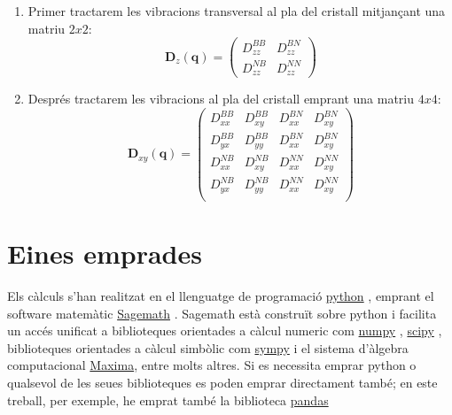 \documentclass[12pt]{article} %
\let\vec\mathbf %
\begin{document}
\begin{enumerate}
 \item Primer tractarem les vibracions transversal al pla del cristall mitjançant una matriu $2x2$:
 \begin{equation}
  \vec D_z(\vec q)=
  \begin{pmatrix}
    D_{zz}^{BB}  & D_{zz}^{BN}        \\
    D_{zz}^{NB}  & D_{zz}^{NN} 
  \end{pmatrix}
\end{equation}

 \item Després tractarem les vibracions al pla del cristall emprant una matriu $4x4$:
 \begin{equation}
  \vec D_{xy}(\vec q)=
  \begin{pmatrix}
   D_{xx}^{BB} & D_{xy}^{BB} & D_{xx}^{BN} & D_{xy}^{BN}  \\
   D_{yx}^{BB} & D_{yy}^{BB} & D_{xx}^{BN} & D_{xy}^{BN}  \\
   D_{xx}^{NB} & D_{xy}^{NB} & D_{xx}^{NN} & D_{xy}^{NN} \\
   D_{yx}^{NB} & D_{yy}^{NB} & D_{xx}^{NN} & D_{xy}^{NN} \\
  \end{pmatrix}
\end{equation}

\end{enumerate}


 
\newpage


\section{Eines emprades}

Els càlculs s'han realitzat en el llenguatge de programació \href{https://www.python.org/}{python} \cite{4160250}, emprant el software matemàtic \href{https://www.sagemath.org/}{Sagemath} \cite{sagemath}. Sagemath està construït sobre python i facilita un accés unificat a biblioteques orientades a càlcul numeric com \href{https://numpy.org/}{numpy} \cite{harris2020array} , \href{https://scipy.org/}{scipy} \cite{2020SciPy-NMeth}, biblioteques orientades a càlcul simbòlic com \href{https://www.sympy.org/}{sympy} i el sistema d'àlgebra computacional \href{https://maxima.sourceforge.io/}{Maxima}, entre molts altres. Si es necessita emprar python o qualsevol de les seues biblioteques es poden emprar directament també; en este treball, per exemple, he emprat també la biblioteca \href{https://pandas.pydata.org/}{pandas}\cite{reback2020pandas} 
\end{document}
